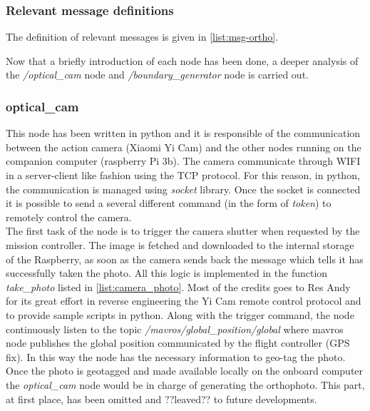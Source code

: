 \subsubsection{Relevant message definitions} %
\label{ssub:relevant_message_definitions}
The definition of relevant messages is given in \autoref{list:msg-ortho}.
\par

Now that a briefly introduction of each node has been done, a deeper analysis of the \textit{/optical\_cam} node and \textit{/boundary\_generator} node is carried out.


\subsubsection{optical\_cam} %
\label{ssub:optical_cam}
This node has been written in python and it is responsible of the communication between the action camera (Xiaomi Yi Cam) and the other nodes running on the companion computer (raspberry Pi 3b). The camera communicate through WIFI in a server-client like fashion using the TCP protocol. For this reason, in python, the communication is managed using \textit{socket} library.
Once the socket is connected it is possible to send a several different command (in the form of \textit{token}) to remotely control the camera.\\
The first task of the node is to trigger the camera shutter when requested by the mission controller. The image is fetched and downloaded to the internal storage of the Raspberry, as soon as the camera sends back the message which tells it has successfully taken the photo. All this logic is implemented in the function \textit{take\_photo} listed in \autoref{list:camera_photo}. Most of the credits goes to Res Andy for its great effort in reverse engineering the Yi Cam remote control protocol and to provide sample scripts in python. \cite{YiCamGit}
Along with the trigger command, the node continuously listen to the topic \textit{/mavros/global\_position/global} where mavros node publishes the global position communicated by the flight controller (GPS fix). In this way the node has the necessary information to geo-tag the photo.
Once the photo is geotagged and made available locally on the onboard computer the \textit{optical\_cam} node would be in charge of generating the orthophoto. This part, at first place, has been omitted and ??leaved?? to future developments.


